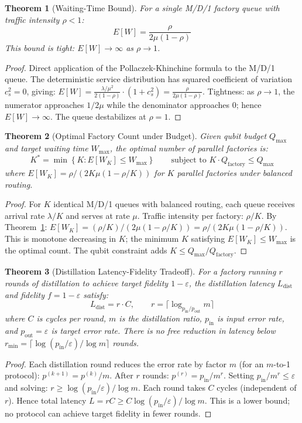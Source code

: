 \documentclass[11pt,letterpaper]{article}
\newtheorem{theorem}{Theorem}[section]
\begin{document}
\begin{theorem}[Waiting-Time Bound]
\label{thm:wait}
For a single M/D/1 factory queue with traffic intensity $\rho < 1$:
\[
E[W] = \frac{\rho}{2\mu(1-\rho)}
\]
This bound is tight: $E[W] \to \infty$ as $\rho \to 1$.
\end{theorem}
\begin{proof}
Direct application of the Pollaczek-Khinchine formula to the M/D/1 queue. The deterministic
service distribution has squared coefficient of variation $c_s^2 = 0$, giving:
$E[W] = \frac{\lambda/\mu^2}{2(1-\rho)} \cdot (1 + c_s^2) = \frac{\rho}{2\mu(1-\rho)}$.
Tightness: as $\rho \to 1$, the numerator approaches $1/2\mu$ while the denominator
approaches $0$; hence $E[W] \to \infty$. The queue destabilizes at $\rho = 1$.
\end{proof}

\begin{theorem}[Optimal Factory Count under Budget]
\label{thm:budget}
Given qubit budget $Q_{\max}$ and target waiting time $W_{\max}$, the optimal number of
parallel factories is:
\[
K^* = \min\!\left\{K : E[W_K] \leq W_{\max}\right\}
\qquad \text{subject to } K \cdot Q_{\mathrm{factory}} \leq Q_{\max}
\]
where $E[W_K] = \rho/(2K\mu(1-\rho/K))$ for $K$ parallel factories under balanced routing.
\end{theorem}
\begin{proof}
For $K$ identical M/D/1 queues with balanced routing, each queue receives arrival rate
$\lambda/K$ and serves at rate $\mu$. Traffic intensity per factory: $\rho/K$. By
Theorem~\ref{thm:wait}: $E[W_K] = (\rho/K)/(2\mu(1-\rho/K)) = \rho/(2K\mu(1-\rho/K))$.
This is monotone decreasing in $K$; the minimum $K$ satisfying $E[W_K] \leq W_{\max}$ is
the optimal count. The qubit constraint adds $K \leq Q_{\max}/Q_{\mathrm{factory}}$.
\end{proof}

\begin{theorem}[Distillation Latency-Fidelity Tradeoff]
\label{thm:tradeoff}
For a factory running $r$ rounds of distillation to achieve target fidelity $1-\varepsilon$,
the distillation latency $L_{\mathrm{dist}}$ and fidelity $f = 1-\varepsilon$ satisfy:
\[
L_{\mathrm{dist}} = r \cdot C, \qquad r = \lceil\log_{p_{\mathrm{in}}/p_{\mathrm{out}}} m\rceil
\]
where $C$ is cycles per round, $m$ is the distillation ratio, $p_{\mathrm{in}}$ is input
error rate, and $p_{\mathrm{out}} = \varepsilon$ is target error rate. There is no free
reduction in latency below $r_{\min} = \lceil\log(p_{\mathrm{in}}/\varepsilon)/\log m\rceil$
rounds.
\end{theorem}
\begin{proof}
Each distillation round reduces the error rate by factor $m$ (for an $m$-to-1 protocol):
$p^{(k+1)} = p^{(k)}/m$. After $r$ rounds: $p^{(r)} = p_{\mathrm{in}}/m^r$.
Setting $p_{\mathrm{in}}/m^r \leq \varepsilon$ and solving: $r \geq \log(p_{\mathrm{in}}/\varepsilon)/\log m$.
Each round takes $C$ cycles (independent of $r$). Hence total latency $L = rC \geq C\log(p_{\mathrm{in}}/\varepsilon)/\log m$.
This is a lower bound; no protocol can achieve target fidelity in fewer rounds.
\end{proof}
\end{document}
